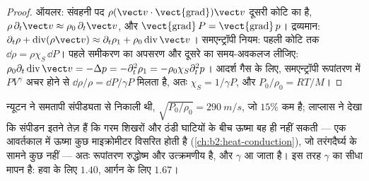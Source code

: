 \begin{proof}
ऑयलर: संवहनी पद $\rho(\vect v\cdot\operatorname{\vect{grad}})\vect v$
दूसरी कोटि का है, $\rho\,\partial_t\vect v \approx \rho_0\,\partial_t\vect v$, और
$\operatorname{\vect{grad}}P = \operatorname{\vect{grad}}p$। द्रव्यमान: $\partial_t\rho +
\operatorname{div}(\rho\vect v) \approx \partial_t\rho_1 + \rho_0\operatorname{div}\vect v$।
समएन्ट्रॉपी नियम: पहली कोटि तक $\dd\rho = \rho\chi_S\,\dd P$। पहले समीकरण का
अपसरण और दूसरे का समय-अवकलज लीजिए:
$\rho_0\partial_t\operatorname{div}\vect v = -\Delta p = -\partial_t^2\rho_1 = -\rho_0\chi_S
\partial_t^2p$। आदर्श गैस के लिए, समएन्ट्रॉपी रूपांतरण में $PV^\gamma$
अचर होने से $\dd\rho/\rho = \dd P/\gamma P$ मिलता है, अतः $\chi_S = 1/\gamma P$,
और $P_0/\rho_0 = RT/M$।
\end{proof}

\begin{remark}[समएन्ट्रॉपी क्यों]\label{rem:b2:sound-waves:laplace}
न्यूटन ने  समतापी संपीड्यता से निकाली थी,
$\sqrt{P_0/\rho_0} = \qty{290}{m/s}$, जो $15\%$ कम है; लाप्लास ने देखा कि
संपीडन इतने तेज़ हैं कि गरम शिखरों और ठंडी घाटियों के बीच ऊष्मा बह ही
नहीं सकती --- एक आवर्तकाल में ऊष्मा कुछ माइक्रोमीटर विसरित होती है
(\cref{ch:b2:heat-conduction}), जो तरंगदैर्घ्य के सामने कुछ नहीं ---
अतः रूपांतरण रुद्धोष्म और उत्क्रमणीय है, और $\gamma$ आ जाता है।
इस तरह  $\gamma$ का सीधा मापन है: हवा के लिए $1.40$,
आर्गन के लिए $1.67$।
\end{remark}

